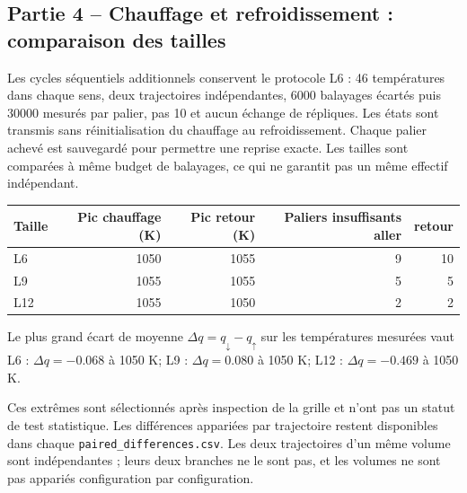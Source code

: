 \subsection{Partie 4 -- Chauffage et refroidissement : comparaison des tailles}

\label{sec:cycles-tailles}

Les cycles séquentiels additionnels conservent le protocole L6 : 46 températures dans chaque sens, deux trajectoires indépendantes, 6000 balayages écartés puis 30000 mesurés par palier, pas 10 et aucun échange de répliques. Les états sont transmis sans réinitialisation du chauffage au refroidissement. Chaque palier achevé est sauvegardé pour permettre une reprise exacte. Les tailles sont comparées à même budget de balayages, ce qui ne garantit pas un même effectif indépendant.


\begin{center}\small\begin{tabular}{lrrrr}\toprule

Taille & Pic chauffage (K) & Pic retour (K) & Paliers insuffisants aller & retour\\\midrule

L6 & 1050 & 1055 & 9 & 10\\

L9 & 1055 & 1055 & 5 & 5\\

L12 & 1055 & 1050 & 2 & 2\\

\bottomrule\end{tabular}\end{center}

Le plus grand écart de moyenne $\Delta q=q_\downarrow-q_\uparrow$ sur les températures mesurées vaut L6 : $\Delta q=-0.068$ à 1050 K; L9 : $\Delta q=0.080$ à 1050 K; L12 : $\Delta q=-0.469$ à 1050 K.

Ces extrêmes sont sélectionnés après inspection de la grille et n’ont pas un statut de test statistique. Les différences appariées par trajectoire restent disponibles dans chaque \texttt{paired\_differences.csv}. Les deux trajectoires d’un même volume sont indépendantes ; leurs deux branches ne le sont pas, et les volumes ne sont pas appariés configuration par configuration.

